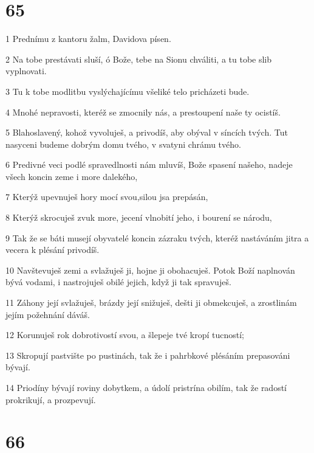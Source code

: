 \chapter{65}

\par 1 Prednímu z kantoru žalm, Davidova písen.
\par 2 Na tobe prestávati sluší, ó Bože, tebe na Sionu chváliti, a tu tobe slib vyplnovati.
\par 3 Tu k tobe modlitbu vyslýchajícímu všeliké telo pricházeti bude.
\par 4 Mnohé nepravosti, kteréž se zmocnily nás, a prestoupení naše ty ocistíš.
\par 5 Blahoslavený, kohož vyvoluješ, a privodíš, aby obýval v síncích tvých. Tut nasyceni budeme dobrým domu tvého, v svatyni chrámu tvého.
\par 6 Predivné veci podlé spravedlnosti nám mluvíš, Bože spasení našeho, nadeje všech koncin zeme i more dalekého,
\par 7 Kterýž upevnuješ hory mocí svou,silou jsa prepásán,
\par 8 Kterýž skrocuješ zvuk more, jecení vlnobití jeho, i bourení se národu,
\par 9 Tak že se báti musejí obyvatelé koncin zázraku tvých, kteréž nastáváním jitra a vecera k plésání privodíš.
\par 10 Navštevuješ zemi a svlažuješ ji, hojne ji obohacuješ. Potok Boží naplnován bývá vodami, i nastrojuješ obilé jejich, když ji tak spravuješ.
\par 11 Záhony její svlažuješ, brázdy její snižuješ, dešti ji obmekcuješ, a zrostlinám jejím požehnání dáváš.
\par 12 Korunuješ rok dobrotivostí svou, a šlepeje tvé kropí tucností;
\par 13 Skropují pastvište po pustinách, tak že i pahrbkové plésáním prepasováni bývají.
\par 14 Priodíny bývají roviny dobytkem, a údolí pristrína obilím, tak že radostí prokrikují, a prozpevují.

\chapter{66}

